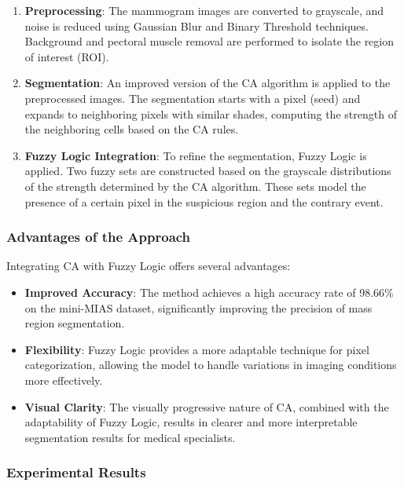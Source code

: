 \documentclass[9pt,a4paper,twoside]{tau-class/tau}
\begin{document}
\begin{enumerate}
    \item \textbf{Preprocessing}: The mammogram images are converted to grayscale, and noise is reduced using Gaussian Blur and Binary Threshold techniques. Background and pectoral muscle removal are performed to isolate the region of interest (ROI).

    \item \textbf{Segmentation}: An improved version of the CA algorithm is applied to the preprocessed images. The segmentation starts with a pixel (seed) and expands to neighboring pixels with similar shades, computing the strength of the neighboring cells based on the CA rules. 

    \item \textbf{Fuzzy Logic Integration}: To refine the segmentation, Fuzzy Logic is applied. Two fuzzy sets are constructed based on the grayscale distributions of the strength determined by the CA algorithm. These sets model the presence of a certain pixel in the suspicious region and the contrary event.
\end{enumerate}

\subsubsection{Advantages of the Approach}

Integrating CA with Fuzzy Logic offers several advantages:

\begin{itemize}
    \item \textbf{Improved Accuracy}: The method achieves a high accuracy rate of 98.66\% on the mini-MIAS dataset, significantly improving the precision of mass region segmentation.
    \item \textbf{Flexibility}: Fuzzy Logic provides a more adaptable technique for pixel categorization, allowing the model to handle variations in imaging conditions more effectively.
    \item \textbf{Visual Clarity}: The visually progressive nature of CA, combined with the adaptability of Fuzzy Logic, results in clearer and more interpretable segmentation results for medical specialists.
\end{itemize}

\subsubsection{Experimental Results}
\end{document}

